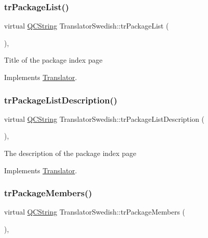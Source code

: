 \subsubsection{\texorpdfstring{trPackageList()}{trPackageList()}}
{\footnotesize\ttfamily virtual \mbox{\hyperlink{class_q_c_string}{Q\+C\+String}} Translator\+Swedish\+::tr\+Package\+List (\begin{DoxyParamCaption}{ }\end{DoxyParamCaption})\hspace{0.3cm}{\ttfamily [inline]}, {\ttfamily [virtual]}}

Title of the package index page 

Implements \mbox{\hyperlink{class_translator}{Translator}}.

\mbox{\label{class_translator_swedish_a45b3fee77279b4fffcb1cc1ba6a960f6}} 
\subsubsection{\texorpdfstring{trPackageListDescription()}{trPackageListDescription()}}
{\footnotesize\ttfamily virtual \mbox{\hyperlink{class_q_c_string}{Q\+C\+String}} Translator\+Swedish\+::tr\+Package\+List\+Description (\begin{DoxyParamCaption}{ }\end{DoxyParamCaption})\hspace{0.3cm}{\ttfamily [inline]}, {\ttfamily [virtual]}}

The description of the package index page 

Implements \mbox{\hyperlink{class_translator}{Translator}}.

\mbox{\label{class_translator_swedish_a645593b549f164a37658d4f43a3e0498}} 
\subsubsection{\texorpdfstring{trPackageMembers()}{trPackageMembers()}}
{\footnotesize\ttfamily virtual \mbox{\hyperlink{class_q_c_string}{Q\+C\+String}} Translator\+Swedish\+::tr\+Package\+Members (\begin{DoxyParamCaption}{ }\end{DoxyParamCaption})\hspace{0.3cm}{\ttfamily [inline]}, {\ttfamily [virtual]}}

